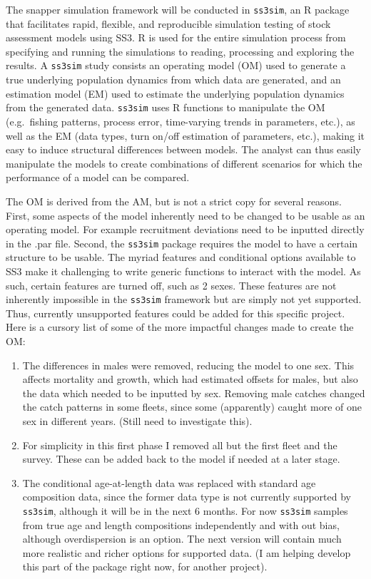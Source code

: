 \documentclass{article}
\begin{document}
The snapper simulation framework will be conducted in \texttt{ss3sim}, an R
package that facilitates rapid, flexible, and reproducible simulation
testing of stock assessment models using SS3. R is used for the entire
simulation process from specifying and running the simulations to reading,
processing and exploring the results. A \texttt{ss3sim} study consists an
operating model (OM) used to generate a true underlying population dynamics
from which data are generated, and an estimation model (EM) used to
estimate the underlying population dynamics from the generated
data. \texttt{ss3sim} uses R functions to manipulate the OM (e.g.\ fishing
patterns, process error, time-varying trends in parameters, etc.), as well
as the EM (data types, turn on/off estimation of parameters, etc.), making
it easy to induce structural differences between models. The analyst can
thus easily manipulate the models to create combinations of different
scenarios for which the performance of a model can be compared.

The OM is derived from the AM, but is not a strict copy for several
reasons. First, some aspects of the model inherently need to be changed to
be usable as an operating model. For example recruitment deviations need to
be inputted directly in the .par file. Second, the \texttt{ss3sim} package
requires the model to have a certain structure to be usable. The myriad
features and conditional options available to SS3 make it challenging to
write generic functions to interact with the model. As such, certain
features are turned off, such as 2 sexes. These features are not inherently
impossible in the \texttt{ss3sim} framework but are simply not yet
supported. Thus, currently unsupported features could be added for this
specific project. Here is a cursory list of some of the more impactful
changes made to create the OM:
\begin{enumerate}
\item The differences in males were removed, reducing the model to one
  sex. This affects mortality and growth, which had estimated offsets for
  males, but also the data which needed to be inputted by sex. Removing
  male catches changed the catch patterns in some fleets, since some
  (apparently) caught more of one sex in different years. (Still need to
  investigate this).
\item For simplicity in this first phase I removed all but the first fleet
  and the survey. These can be added back to the model if needed at a later
  stage.
\item The conditional age-at-length data was replaced with standard age
  composition data, since the former data type is not currently supported
  by \texttt{ss3sim}, although it will be in the next 6 months. For now
  \texttt{ss3sim} samples from true age and length compositions
  independently and with out bias, although overdispersion is an
  option. The next version will contain much more realistic and richer
  options for supported data. (I am helping develop this part of the
  package right now, for another project).
\end{enumerate}
\end{document}
